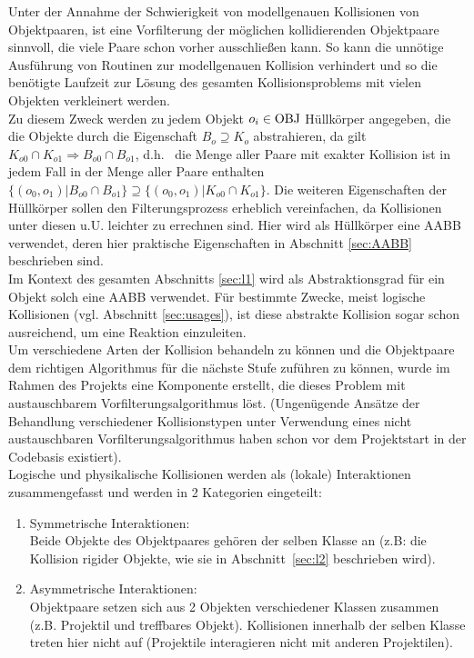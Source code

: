 \label{sec:l1}
Unter der Annahme der Schwierigkeit von modellgenauen Kollisionen von Objektpaaren, ist eine Vorfilterung der möglichen kollidierenden Objektpaare sinnvoll, die viele Paare schon vorher ausschließen kann. So kann die unnötige Ausführung von Routinen zur modellgenauen Kollision verhindert und so die benötigte Laufzeit zur Lösung des gesamten Kollisionsproblems mit vielen Objekten verkleinert werden.\\
Zu diesem Zweck werden zu jedem Objekt $o_i \in \operatorname{OBJ}$ Hüllkörper angegeben, die die Objekte durch die Eigenschaft $B_o \supseteq K_o$ abstrahieren, da gilt $K_{o0} \cap K_{o1} \Rightarrow B_{o0} \cap B_{o1}$, d.h.~ die Menge aller Paare mit exakter Kollision ist in jedem Fall in der Menge aller Paare enthalten $ \{ (o_0, o_1) | B_{o0} \cap B_{o1} \} \supseteq \{ (o_0, o_1) | K_{o0} \cap K_{o1} \} $.
Die weiteren Eigenschaften der Hüllkörper sollen den Filterungsprozess erheblich vereinfachen, da Kollisionen unter diesen u.U. leichter zu errechnen sind. Hier wird als Hüllkörper eine AABB verwendet, deren hier praktische Eigenschaften in Abschnitt \ref{sec:AABB} beschrieben sind.\\
Im Kontext des gesamten Abschnitts \ref{sec:l1} wird als Abstraktionsgrad für ein Objekt solch eine AABB verwendet. Für bestimmte Zwecke, meist logische Kollisionen (vgl. Abschnitt \ref{sec:usages}), ist diese abstrakte Kollision sogar schon ausreichend, um eine Reaktion einzuleiten.\\
Um verschiedene Arten der Kollision behandeln zu können und die Objektpaare dem richtigen Algorithmus für die nächste Stufe zuführen zu können, wurde im Rahmen des Projekts eine Komponente erstellt, die dieses Problem mit austauschbarem Vorfilterungsalgorithmus löst. (Ungenügende Ansätze der Behandlung verschiedener Kollisionstypen unter Verwendung eines nicht austauschbaren Vorfilterungsalgorithmus haben schon vor dem Projektstart in der Codebasis existiert). \\
Logische und physikalische Kollisionen werden als (lokale) Interaktionen zusammengefasst und werden in 2 Kategorien eingeteilt:
\begin{enumerate}
\item Symmetrische Interaktionen:\\
Beide Objekte des Objektpaares gehören der selben Klasse an (z.B: die Kollision rigider Objekte, wie sie in Abschnitt~\ref{sec:l2} beschrieben wird).
\item Asymmetrische Interaktionen:\\
Objektpaare setzen sich aus 2 Objekten verschiedener Klassen zusammen (z.B. Projektil und treffbares Objekt). Kollisionen innerhalb der selben Klasse treten hier nicht auf (Projektile interagieren nicht mit anderen Projektilen).
\end{enumerate}

